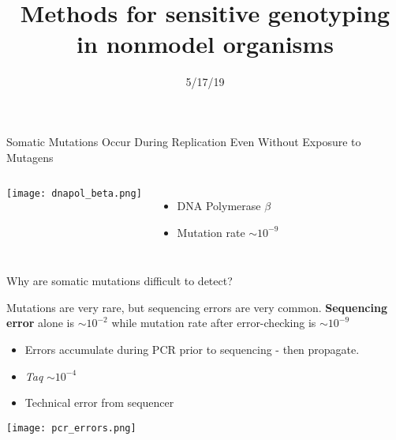 \documentclass{beamer}
\title[Sensitive Genotyping]{Methods for sensitive genotyping in nonmodel organisms}
\date{5/17/19}
\author{Adam Orr\hskip 1em \faicon{twitter}@AdamJOrr}
\begin{document}
\frame{\titlepage}

\begin{frame}{Somatic Mutations Occur During Replication Even Without Exposure to Mutagens}
\begin{columns}
		\texttt{[image: dnapol\_beta.png]}
		\begin{itemize}
			\item DNA Polymerase $\beta$
			\item Mutation rate $\sim10^{-9}$
		\end{itemize}
		\vskip 3in
\end{columns}
\end{frame}

\begin{frame}{Why are somatic mutations difficult to detect?}

\begin{block}{Mutations are very rare, but sequencing errors are very common.}
\textbf{Sequencing error} alone is \textbf{$\sim10^{-2}$} while mutation rate after error-checking is \textbf{$\sim10^{-9}$}
\end{block}

\begin{itemize}
\item Errors accumulate during PCR prior to sequencing - then propagate.
\item \textit{Taq} $\sim10^{-4}$
\item Technical error from sequencer
\end{itemize}

\texttt{[image: pcr\_errors.png]}


\end{frame}
\end{document}
